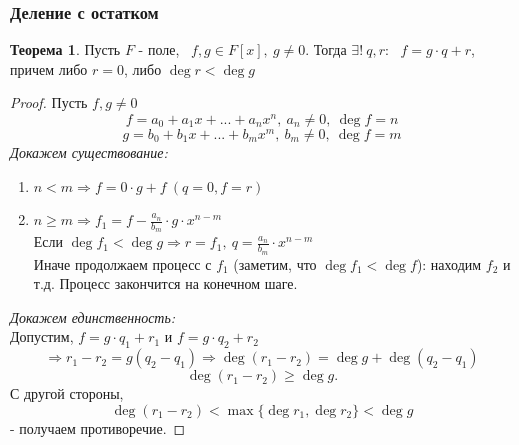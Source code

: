 \documentclass[a4paper, 12pt]{article}
\theoremstyle{definition}
\newtheorem*{theorem}{Теорема}
\begin{document}
  \subsubsection{Деление с остатком}
  \begin{theorem}
    Пусть $F$ - поле, \ $f, g \in F[x],\ g\neq 0 $. Тогда $\exists ! \ q, r$: \ $f = g \cdot q + r$, \\причем либо $r=0$, либо $\deg r < \deg g$       
  \end{theorem}
  \begin{proof}
    Пусть $f, g \neq 0$$$f = a_0 + a_1x+...+a_nx^n, \ a_n \neq 0, \ \deg f = n$$ $$g = b_0 + b_1x+...+b_mx^m, \ b_m \neq 0, \ \deg f = m$$ 
    \textit{Докажем существование:} 
    \begin{enumerate}
      \item $n<m \Longrightarrow f = 0 \cdot g + f \ (q=0, f = r)$
      \item $n\geq m \Longrightarrow f_1 = f - \frac{a_n}{b_m} \cdot g \cdot x^{n-m}$ \\
      Если $\deg f_1 < \deg g \Longrightarrow r = f_1, \ q = \frac{a_n}{b_m}\cdot x^{n-m}$ \\
      Иначе продолжаем процесс с $f_1$ (заметим, что $\deg f_1 < \deg f$): находим $f_2 $ и т.д. Процесс закончится на конечном шаге.  
    \end{enumerate}
    \textit{Докажем единственность:}  \\
    Допустим, $ f = g \cdot q_1 + r_1$ и $f = g \cdot q_2 + r_2$ $$  \Longrightarrow r_1 - r_2 = g(q_2 - q_1) \Longrightarrow \deg (r_1-r_2) = \deg g + \deg (q_2 - q_1) $$ $$\deg(r_1 - r_2) \geq \deg g.$$ С другой стороны, $$\deg (r_1-r_2) < \max \{\deg r_1, \deg r_2\} < \deg g$$ - получаем противоречие.   
  \end{proof} 
\end{document}
